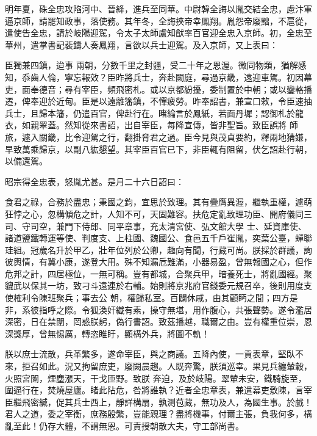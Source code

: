 \begin{pinyinscope}
 明年夏，硃全忠攻陷河中、晉絳，進兵至同華。中尉韓全誨以胤交結全忠，慮汴軍逼京師，請罷知政事，落使務。其年冬，全誨挾帝幸鳳翔。胤怨帝廢黜，不扈從，遣使告全忠，請於岐陽迎駕，令太子太師盧知猷率百官迎全忠入京師。初，全忠至華州，遣掌書記裴鑄人奏鳳翔，言欲以兵士迎駕。及入京師，又上表曰：



 臣獨兼四鎮，迨事
 兩朝，分數千里之封疆，受二十年之恩渥。微同物類，猶解感知，忝齒人倫，寧忘報效？臣昨將兵士，奔赴闕庭，尋過京畿，遠迎車駕。初因幕吏，面奉德音；尋有宰臣，頻飛密札。或以京都紛擾，委制置於中朝；或以鑾輅播遷，俾奉迎於近甸。臣是以遠離籓鎮，不憚疲勞。昨奉詔書，兼宣口敕，令臣速抽兵士，且歸本籓，仍遣百官，俾赴行在。睹綸言於鳳紙，若面丹墀；認御札於龍衣，如親翠蓋。然知從來書詔，出自宰臣，每降宣傳，皆非聖旨。致臣誤將
 師旅，遽入關畿，比令迎駕之行，翻掛脅君之過。臣今見與茂貞要約，釋兩地猜嫌，早致萬乘歸京，以副八紘懇望。其宰臣百官已下，非臣輒有阻留，伏乞詔赴行朝，以備還駕。



 昭宗得全忠表，怒胤尤甚。是月二十六日詔曰：



 食君之祿，合務於盡忠；秉國之鈞，宜思於致理。其有疊膺異渥，繼執重權，遽萌狂悖之心，忽構傾危之計，人知不可，天固難容。扶危定亂致理功臣、開府儀同三司、守司空，兼門下侍郎、同平章事，充太清宮使、弘文館大學
 士、延資庫使、諸道鹽鐵轉運等使、判度支、上柱國、魏國公、食邑五千戶崔胤，奕葉公臺，蟬聯珪組。冠歲名升於甲乙，壯年位列於公卿，趣向有聞，行藏可尚。朕採於群議，詢彼輿情，有冀小康，遂登大用。殊不知漏卮難滿，小器易盈，曾無報國之心，但作危邦之計，四居極位，一無可稱。豈有都城，合聚兵甲，暗養死士，將亂國經。聚貔武以保其一坊，致刁斗遠連於右輔。始則將京兆府官錢委元規召卒，後則用度支使榷利令陳班聚兵；事去公
 朝，權歸私室。百闢休戚，由其顧眄之間；四方是非，系彼指呼之際。令狐渙奸纖有素，操守無堪，用作腹心，共張聲勢。遂令濫居深密，日在禁闈，罔惑朕躬，偽行書詔。致茲播越，職爾之由。豈有權重位崇，恩深獎厚，曾無惕厲，轉恣睢盱，顯構外兵，將圖不軌！



 朕以庶士流散，兵革繁多，遂命宰臣，與之商議。五降內使，一貢表章，堅臥不來，拒召如此。況又拘留庶吏，廢闕晨趨。人既奔驚，朕須巡幸。果見兵纏輦轂，火照宮闈，煙塵漲天，干戈匝野。致朕
 奔迫，及於岐陽。翠輦未安，鐵騎旋至，圍逼行在，焚燒屋廬。睹此阽危，咎將誰執？近者全忠章表，兼遣幕吏敷陳，言宰臣繼飛密緘，促其兵士西上，靜詳構扇，孰測苞藏，無功及人，為國生事。於戲！君人之道，委之宰衡，庶務殷繁，豈能親理？盡將機事，付爾主張，負我何多，構亂至此！仍存大體，不謂無恩。可責授朝散大夫，守工部尚書。




\end{pinyinscope}
